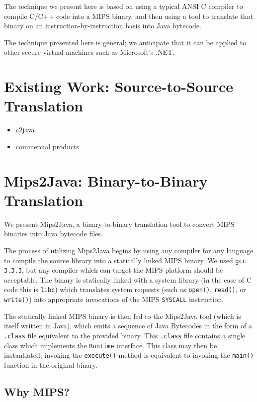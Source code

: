 \documentclass{acmconf}
\begin{document}
The technique we present here is based on using a typical ANSI C
compiler to compile C/C++ code into a MIPS binary, and then using a
tool to translate that binary on an instruction-by-instruction basis
into Java bytecode.

The technique presented here is general; we anticipate that it can be
applied to other secure virtual machines such as Microsoft's .NET.


\section{Existing Work: Source-to-Source Translation}

\begin{itemize}
\item c2java
\item commercial products
\end{itemize}

\section{Mips2Java: Binary-to-Binary Translation}

We present Mips2Java, a binary-to-binary translation tool to convert
MIPS binaries into Java bytecode files.

The process of utilizing Mips2Java begins by using any compiler for
any language to compile the source library into a statically linked
MIPS binary.  We used {\tt gcc 3.3.3}, but any compiler which can
target the MIPS platform should be acceptable.  The binary is
statically linked with a system library (in the case of C code this is
{\tt libc}) which translates system requests (such as {\tt open()},
{\tt read()}, or {\tt write()}) into appropriate invocations of the
MIPS {\tt SYSCALL} instruction.

The statically linked MIPS binary is then fed to the Mips2Java tool
(which is itself written in Java), which emits a sequence of Java
Bytecodes in the form of a {\tt .class} file equivalent to the
provided binary.  This {\tt .class} file contains a single class which
implements the {\tt Runtime} interface.  This class may then be
instantiated; invoking the {\tt execute()} method is equivalent to
invoking the {\tt main()} function in the original binary.


\subsection{Why MIPS?}
\end{document}
